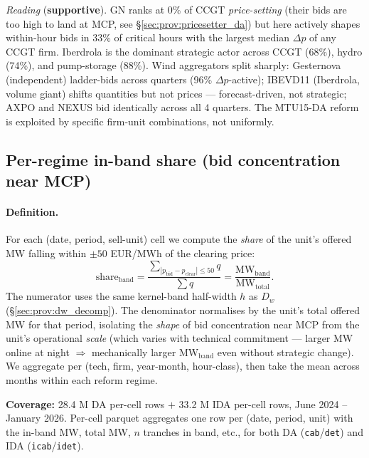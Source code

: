 \documentclass[11pt,a4paper]{article}
\begin{document}
\textit{Reading} (\textbf{supportive}). GN ranks at 0\% of CCGT \emph{price-setting} (their bids are too high to land at MCP, see \S\ref{sec:prov:pricesetter_da}) but here actively shapes within-hour bids in $33\%$ of critical hours with the largest median $\Delta p$ of any CCGT firm. Iberdrola is the dominant strategic actor across CCGT (68\%), hydro (74\%), and pump-storage (88\%). Wind aggregators split sharply: Gesternova (independent) ladder-bids across quarters (96\% $\Delta p$-active); IBEVD11 (Iberdrola, volume giant) shifts quantities but not prices --- forecast-driven, not strategic; AXPO and NEXUS bid identically across all 4 quarters. The MTU15-DA reform is exploited by specific firm-unit combinations, not uniformly.


\subsection{Per-regime in-band share (bid concentration near MCP)}\label{sec:prov:steepness}

\paragraph{Definition.} For each (date, period, sell-unit) cell we compute the \emph{share} of the unit's offered MW falling within $\pm 50$ EUR/MWh of the clearing price:
\[
\text{share}_{\text{band}} = \frac{\sum_{|p_{\text{bid}} - p_{\text{clear}}| \le 50} q}{\sum q}
= \frac{\text{MW}_{\text{band}}}{\text{MW}_{\text{total}}}.
\]
The numerator uses the same kernel-band half-width $h$ as $D_w$ (\S\ref{sec:prov:dw_decomp}). The denominator normalises by the unit's total offered MW for that period, isolating the \emph{shape} of bid concentration near MCP from the unit's operational \emph{scale} (which varies with technical commitment --- larger MW online at night $\Rightarrow$ mechanically larger $\text{MW}_{\text{band}}$ even without strategic change). We aggregate per (tech, firm, year-month, hour-class), then take the mean across months within each reform regime.

\textbf{Coverage:} 28.4 M DA per-cell rows $+$ 33.2 M IDA per-cell rows, June 2024 -- January 2026. Per-cell parquet aggregates one row per (date, period, unit) with the in-band MW, total MW, $n$ tranches in band, etc., for both DA (\texttt{cab}/\texttt{det}) and IDA (\texttt{icab}/\texttt{idet}).
\end{document}
